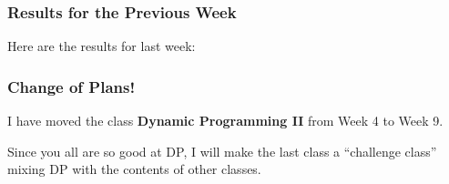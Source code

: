 \begin{frame}
  \frametitle{Results for the Previous Week}

  \begin{center}
    Here are the results for last week:

    \bigskip
    

  \end{center}
\end{frame}

\begin{frame}
  \frametitle{Change of Plans!}

  I have moved the class {\bf Dynamic Programming II} from Week 4 to
  Week 9.

  \vfill
  
  Since you all are so good at DP, I will make the last class a
  ``challenge class'' mixing DP with the contents of other classes.
\end{frame}

